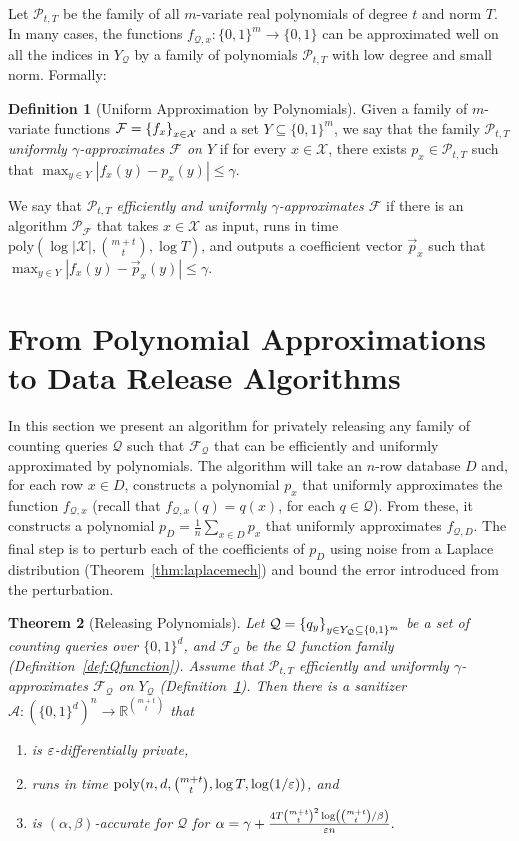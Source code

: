 \documentclass[11pt]{article}
\newcommand\R{\mathbb{R}}
\newcommand\cF{\mathcal{F}}
\newcommand\cP{\mathcal{P}}
\newcommand\cQ{\mathcal{Q}}
\newcommand\cX{\mathcal{X}}
\newcommand\san{\mathcal{A}}
\newcommand\poly{\mathrm{poly}}
\newcommand\bits{\{0,1\}}
\newcommand\from{\colon}
\newtheorem{theorem}{Theorem}[section]
\theoremstyle{definition}
\newtheorem{definition}[theorem]{Definition}
\begin{document}
Let $\cP_{t,T}$ be the family of all $m$-variate real polynomials of degree $t$ and norm $T$.  In many cases, the functions $f_{\cQ, x}: \bits^m \to \bits$ can be approximated well on all the indices in $Y_{\cQ}$ by a family of polynomials $\cP_{t,T}$ with low degree and small norm.  Formally:
\begin{definition}[Uniform Approximation by Polynomials] \label{def:approxbypolys}
Given a family of $m$-variate functions $\cF = \set{f_x}_{x \in \cX}$ and a set $Y \subseteq \bits^m$, we say that the family $\cP_{t,T}$ \emph{uniformly $\gamma$-approximates $\cF$ on $Y$} if for every $x \in \cX$, there exists $p_{x} \in \cP_{t,T}$ such that $\max_{y \in Y} | f_x(y) - p_{x}(y) | \leq \gamma$.

We say that $\cP_{t,T}$ \emph{efficiently and uniformly $\gamma$-approximates $\cF$} if there is an algorithm $\cP_{\cF}$ that takes $x \in \cX$ as input, runs in time $\poly(\log|\cX|, \binom{m+t}{t}, \log T)$, and outputs a coefficient vector $\vec{p}_{x}$ such that $\max_{y \in Y} |f_x(y) - \vec{p}_{x}(y)| \leq \gamma$.
\end{definition}
\section{From Polynomial Approximations to Data Release Algorithms} \label{sec:release}
In this section we present an algorithm for privately releasing any family of counting queries $\cQ$ such that $\cF_{\cQ}$ that can be efficiently and uniformly approximated by polynomials.  The algorithm will take an $n$-row database $D$ and, for each row $x \in D$, constructs a polynomial $p_{x}$ that uniformly approximates the function $f_{\cQ, x}$ (recall that $f_{\cQ, x}(q) = q(x)$, for each $q \in \cQ$).  From these, it constructs a polynomial $p_{D} = \frac{1}{n} \sum_{x \in D} p_{x}$ that uniformly approximates $f_{\cQ, D}$.  The final step is to perturb each of the coefficients of $p_{D}$ using noise from a Laplace distribution (Theorem~\ref{thm:laplacemech}) and bound the error introduced from the perturbation.

\begin{theorem}[Releasing Polynomials] \label{thm:releasepolys}
Let $\cQ = \set{q_y}_{y \in Y_{\cQ} \subseteq \bits^m}$ be a set of counting queries over $\bits^d$, and $\cF_{\cQ}$ be the $\cQ$ function family (Definition~\ref{def:Qfunction}).  Assume that $\cP_{t,T}$ efficiently and uniformly $\gamma$-approximates $\cF_{\cQ}$ on $Y_{\cQ}$ (Definition~\ref{def:approxbypolys}).  Then there is a sanitizer $\san\from (\bits^d)^n \to \R^{\binom{m+t}{t}}$ that
\begin{enumerate}
\item is $\varepsilon$-differentially private,
\item runs in time $\poly(n, d, \binom{m+t}{t}, \log T, \log(1/\eps))$, and
\item is $(\alpha, \beta)$-accurate for $\cQ$ for
$
\alpha = \gamma + \frac{4 T \binom{m+t}{t}^2 \log\left(\binom{m+t}{t} / \beta\right)}{\varepsilon n}.
$
\end{enumerate}
\end{theorem}
\end{document}

